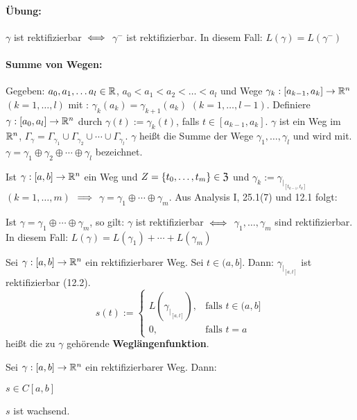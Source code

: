 \documentclass[a4paper,twoside,DIV15,BCOR12mm,chapterprefix=true,headings=twolinechapter]{scrbook}
\begin{document}
\paragraph{Übung:} $\gamma$ ist rektifizierbar $\iff$ $\gamma^-$ ist rektifizierbar. In diesem Fall: \mbox{$L(\gamma) = L(\gamma^-)$}

\paragraph{Summe von Wegen:}Gegeben: $a_0, a_1,\ldots a_l \in \mathbb{R}$, $a_0<a_1<a_2<\ldots<a_l$ und Wege $\gamma_k:[a_{k-1},a_k] \to \mathbb{R}^n$ $(k=1,\ldots,l)$ mit : $\gamma_k(a_k) = \gamma_{k+1}(a_k)$ $(k=1,\ldots,l-1)$.
Definiere $\gamma:[a_0,a_l]\to\mathbb{R}^n$ durch $\gamma(t):=\gamma_k(t)$, falls $t\in[a_{k-1},a_k]$. $\gamma$ ist ein Weg im $\mathbb{R}^n$, $\Gamma_\gamma = \Gamma_{\gamma_1} \cup \Gamma_{\gamma_2} \cup \cdots \cup \Gamma_{\gamma_l}$. $\gamma$ heißt die Summe der Wege $\gamma_1,\ldots,\gamma_l$ und wird mit. $\gamma = \gamma_1 \oplus \gamma_2 \oplus \cdots \oplus \gamma_l$ bezeichnet. 

\begin{bemerkung}
Ist $\gamma:[a,b]\to\mathbb{R}^n$ ein Weg und $Z=\{t_0,\ldots,t_m\}\in\mathfrak{Z}$ und $\gamma_k:=\gamma_{|_{[t_{k-1},t_k]}}$ $(k=1,\ldots,m)$ $\implies$ $\gamma = \gamma_1 \oplus \cdots \oplus \gamma_m$. Aus Analysis I, 25.1(7) und 12.1 folgt: 
\end{bemerkung}

\begin{satz}
Ist $\gamma = \gamma_1 \oplus \cdots \oplus \gamma_m$, so gilt: $\gamma$ ist rektifizierbar $\iff$ $\gamma_1,\ldots,\gamma_m$ sind rektifizierbar. In diesem Fall: $L(\gamma)=L(\gamma_1) + \cdots + L(\gamma_m)$
\end{satz}

\begin{definition}
Sei $\gamma:[a,b]\to\mathbb{R}^n$ ein rektifizierbarer Weg. Sei $t\in(a,b]$. Dann: $\gamma_{|_{[a,t]}}$ ist rektifizierbar (12.2).
$$s(t):= \begin{cases}L(\gamma_{|_{[a,t]}}),&\text{falls }t\in(a,b] \\0, &\text{falls }t=a\end{cases}$$ heißt die zu $\gamma$ gehörende \textbf{Weglängenfunktion}.
\end{definition}

\begin{satz}
Sei $\gamma:[a,b]\to\mathbb{R}^n$ ein rektifizierbarer Weg. Dann: 
\begin{liste}
\item $s\in C[a,b]$
\item $s$ ist wachsend.
\end{liste}
\end{satz}
\end{document}
